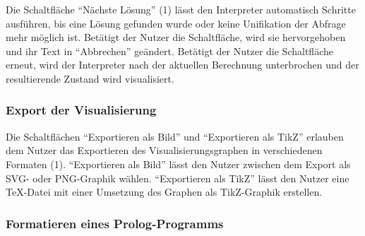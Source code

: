 \documentclass[parskip=full,11pt,twoside]{scrartcl}
\begin{document}
\begin{minipage}{\linewidth}
\end{minipage}

\begin{minipage}{\linewidth}
\end{minipage}

Die Schaltfläche \enquote{Nächste Lösung} (1) lässt den Interpreter automatisch Schritte ausführen, bis eine Lösung gefunden wurde oder keine Unifikation der Abfrage mehr möglich ist.
Betätigt der Nutzer die Schaltfläche, wird sie hervorgehoben und ihr Text in \enquote{Abbrechen} geändert.
Betätigt der Nutzer die Schaltfläche erneut, wird der Interpreter nach der aktuellen Berechnung unterbrochen und der resultierende Zustand wird visualisiert.

\subsubsection{Export der Visualisierung}

\begin{minipage}{\linewidth}
\end{minipage}

Die Schaltflächen \enquote{Exportieren als Bild} und \enquote{Exportieren als TikZ} erlauben dem Nutzer das Exportieren des Visualisierungsgraphen in verschiedenen Formaten (1).
\enquote{Exportieren als Bild} lässt den Nutzer zwischen dem Export als SVG- oder PNG-Graphik wählen.
\enquote{Exportieren als TikZ} lässt den Nutzer eine TeX-Datei mit einer Umsetzung des Graphen als TikZ-Graphik erstellen.

\subsubsection{Formatieren eines Prolog-Programms}

\begin{minipage}{\linewidth}
\end{minipage}
\end{document}
